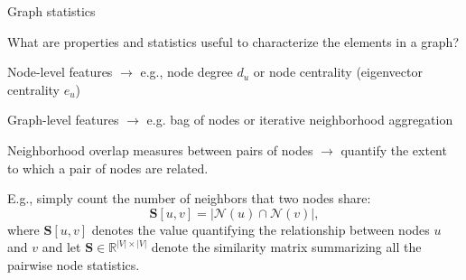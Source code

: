\documentclass[10pt, aspectratio=169, compress, protectframetitle, handout]{beamer}
\begin{document}



    

    
    


\begin{frame}{Graph statistics}

    What are properties and statistics useful to characterize the elements in a graph?
    
    \alert{Node-level features} $\longrightarrow$ e.g., node degree $d_u$ or node centrality (eigenvector centrality $e_u$)
    
    \alert{Graph-level features} $\longrightarrow$ e.g. bag of nodes or iterative neighborhood aggregation

    \alert{Neighborhood overlap measures} between pairs of nodes $\longrightarrow$ quantify the extent to which a pair of nodes are related.
    
    \begin{block}{}%
    E.g., simply count the number of neighbors that two nodes share:
    \begin{equation}
        \mathbf S[u, v] = |\mathcal N(u) \cap \mathcal N(v)|,
    \end{equation}
    where $\mathbf S[u, v]$ denotes the value quantifying the relationship between nodes $u$ and $v$ and let $\mathbf S \in \mathbb R^{|V| \times |V|}$ denote the \alert{similarity matrix} summarizing all the pairwise node statistics.
    \end{block}
    
\end{frame}
\end{document}
